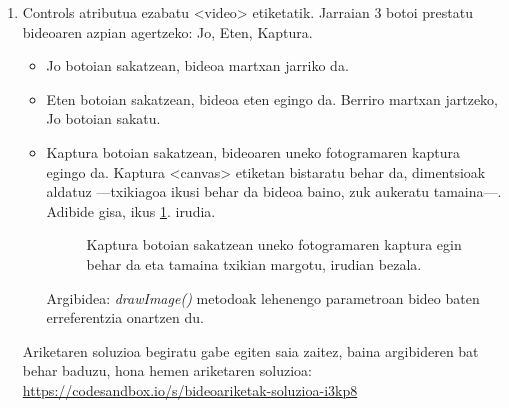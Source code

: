\begin{enumerate}
    \item  Controls atributua ezabatu <video> etiketatik. Jarraian 3 botoi prestatu bideoaren azpian agertzeko: Jo, Eten, Kaptura.

\begin{itemize}
    \item Jo botoian sakatzean, bideoa martxan jarriko da.
     \item  Eten botoian sakatzean, bideoa eten egingo da. Berriro martxan jartzeko, Jo botoian sakatu.
     \item Kaptura botoian sakatzean, bideoaren uneko fotogramaren kaptura egingo da. Kaptura
     <canvas> etiketan bistaratu behar da, dimentsioak aldatuz —txikiagoa ikusi behar da bideoa baino, zuk aukeratu tamaina—. Adibide gisa, ikus \ref{fig:bideoariketa2}. irudia.
     
\begin{figure}[ht]
\centering
{}
\caption{Kaptura botoian sakatzean uneko fotogramaren kaptura egin behar da eta tamaina txikian margotu, irudian bezala.}
\label{fig:bideoariketa2}
\end{figure}
     
Argibidea:\textit{ drawImage()} metodoak lehenengo parametroan bideo baten erreferentzia onartzen du. 
\end{itemize}

Ariketaren soluzioa begiratu gabe egiten saia zaitez, baina argibideren bat behar baduzu, hona hemen ariketaren soluzioa:\newline \href{https://codesandbox.io/s/bideoariketak-soluzioa-i3kp8}{ https://codesandbox.io/s/bideoariketak-soluzioa-i3kp8}


\end{enumerate}
